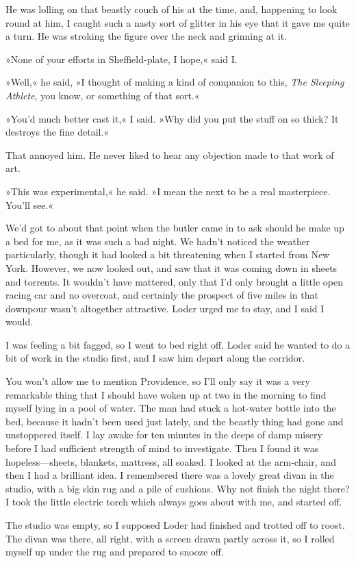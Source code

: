 He was lolling on that beastly couch of his at the time, and, happening to look round at him, I caught such a nasty sort of glitter in his eye that it gave me quite a turn. He was stroking the figure over the neck and grinning at it.

»None of your efforts in Sheffield-plate, I hope,« said I\@.

»Well,« he said, »I thought of making a kind of companion to this, \textit{The Sleeping Athlete}, you know, or something of that sort.«

»You'd much better cast it,« I said. »Why did you put the stuff on so thick? It destroys the fine detail.«

That annoyed him. He never liked to hear any objection made to that work of art.

»This was experimental,« he said. »I mean the next to be a real masterpiece. You'll see.«

We'd got to about that point when the butler came in to ask should he make up a bed for me, as it was such a bad night. We hadn't noticed the weather particularly, though it had looked a bit threatening when I started from New York. However, we now looked out, and saw that it was coming down in sheets and torrents. It wouldn't have mattered, only that I'd only brought a little open racing car and no overcoat, and certainly the prospect of five miles in that downpour wasn't altogether attractive. Loder urged me to stay, and I said I would.

I was feeling a bit fagged, so I went to bed right off. Loder said he wanted to do a bit of work in the studio first, and I saw him depart along the corridor.

You won't allow me to mention Providence, so I'll only say it was a very remarkable thing that I should have woken up at two in the morning to find myself lying in a pool of water. The man had stuck a hot-water bottle into the bed, because it hadn't been used just lately, and the beastly thing had gone and unstoppered itself. I lay awake for ten minutes in the deeps of damp misery before I had sufficient strength of mind to investigate. Then I found it was hopeless—sheets, blankets, mattress, all soaked. I looked at the arm-chair, and then I had a brilliant idea. I remembered there was a lovely great divan in the studio, with a big skin rug and a pile of cushions. Why not finish the night there? I took the little electric torch which always goes about with me, and started off.

The studio was empty, so I supposed Loder had finished and trotted off to roost. The divan was there, all right, with a screen drawn partly across it, so I rolled myself up under the rug and prepared to snooze off.

